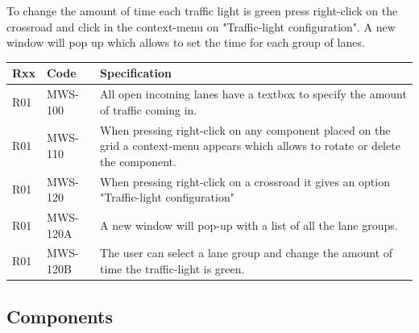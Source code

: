 To change the amount of time each traffic light is green press right-click on the crossroad and click in the context-menu on "Traffic-light configuration". A new window will pop up which allows to set the time for each group of lanes.

\begin{tabularx}{\textwidth}{|p{0.5cm}p{2cm}X|}\hline
	Rxx & Code & Specification \\\hline
	R01 & MWS-100 & All open incoming lanes have a textbox to specify the amount of traffic coming in.\\\hline
	R01 & MWS-110 & When pressing right-click on any component placed on the grid a context-menu appears which allows to rotate or delete the component.\\\hline
	R01 & MWS-120 & When pressing right-click on a crossroad it gives an option "Traffic-light configuration"\\\hline
	R01 & MWS-120A & A new window will pop-up with a list of all the lane groups.\\\hline
	R01 & MWS-120B & The user can select a lane group and change the amount of time the traffic-light is green.\\\hline
\end{tabularx}

\newpage
\subsection{Components}
\label{sec:components}
